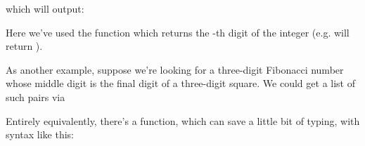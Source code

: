 \documentclass[letterpaper,10pt,english]{sphinxmanual}
\begin{document}
\begin{sphinxVerbatim}[commandchars=\\\{\}]
   
      
\end{sphinxVerbatim}

which will output:

\begin{sphinxVerbatim}[commandchars=\\\{\}]
\end{sphinxVerbatim}

Here we’ve used the  function  which returns the -th digit of the integer  (e.g.  will return ).

As another example, suppose we’re looking for a three-digit Fibonacci number whose middle digit is the final digit of a three-digit square. We could get a list of such pairs via

\begin{sphinxVerbatim}[commandchars=\\\{\}]
   
      
       
\end{sphinxVerbatim}

Entirely equivalently, there’s a  function, which can save a little bit of typing, with syntax like this:

\begin{sphinxVerbatim}[commandchars=\\\{\}]
   
      
       
\end{sphinxVerbatim}
\end{document}

